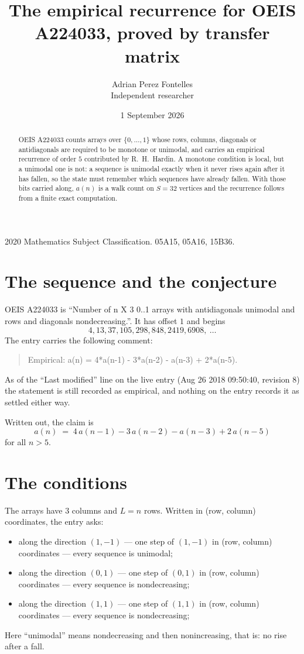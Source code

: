 \documentclass[11pt,a4paper]{article}
\title{The empirical recurrence for OEIS A224033, proved by transfer matrix}
\author{Adrian Perez Fontelles\\ \small Independent researcher}
\date{1 September 2026}
\theoremstyle{plain}
\theoremstyle{definition}
\begin{document}
\maketitle

\begin{abstract}
OEIS A224033 counts arrays over $\{0,\dots,1\}$ whose rows, columns, diagonals or
antidiagonals are required to be monotone or unimodal, and carries an empirical recurrence of
order $5$ contributed by R.~H.~Hardin. A monotone condition is local, but a unimodal one
is not: a sequence is unimodal exactly when it never rises again after it has fallen, so the
state must remember which sequences have already fallen. With those bits carried along, $a(n)$
is a walk count on $S=32$ vertices and the recurrence follows from a finite exact
computation.
\end{abstract}

\noindent\small 2020 Mathematics Subject Classification. 05A15, 05A16, 15B36.\normalsize

\section{The sequence and the conjecture}

OEIS A224033 is ``Number of n X 3 0..1 arrays with antidiagonals unimodal and rows and diagonals nondecreasing.''. It has offset $1$ and begins
\[
4, 13, 37, 105, 298, 848, 2419, 6908,\ \dots
\]
The entry carries the following comment:
\begin{quote}\small
Empirical: a(n) = 4*a(n-1) - 3*a(n-2) - a(n-3) + 2*a(n-5).
\end{quote}
As of the ``Last modified'' line on the live entry (Aug 26 2018 09:50:40, revision 8) the statement is
still recorded as empirical, and nothing on the entry records it as settled either way.

Written out, the claim is
\begin{equation}\label{eq:conj}
a(n)\;=\;4\,a(n-1) - 3\,a(n-2) - a(n-3) + 2\,a(n-5)
\end{equation}
for all $n>5$.

\section{The conditions}

The arrays have $3$ columns and $L=n$ rows. Written in (row, column)
coordinates, the entry asks:
\begin{itemize}
\item along the direction $(1,-1)$ --- one step of $(1,-1)$ in (row, column) coordinates --- every sequence is unimodal;
\item along the direction $(0,1)$ --- one step of $(0,1)$ in (row, column) coordinates --- every sequence is nondecreasing;
\item along the direction $(1,1)$ --- one step of $(1,1)$ in (row, column) coordinates --- every sequence is nondecreasing;
\end{itemize}
Here ``unimodal'' means nondecreasing and then nonincreasing, that is: no rise after a fall.
\end{document}

